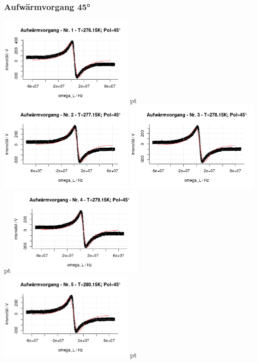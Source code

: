 \documentclass[12pt]{article}
\begin{document}
\subsubsection{Aufwärmvorgang 45°}
\begin{minipage}[h!]{\textwidth}
	\centering
	\includegraphics[width=0.49\textwidth]{figures/warm45-1.png} pt
	\includegraphics[width=0.49\textwidth]{figures/warm45-2.png}\vskip -10pt
	\includegraphics[width=0.49\textwidth]{figures/warm45-3.png} pt
	\includegraphics[width=0.49\textwidth]{figures/warm45-4.png}\vskip -10pt
	\includegraphics[width=0.49\textwidth]{figures/warm45-5.png} pt

\end{minipage}
\end{document}
